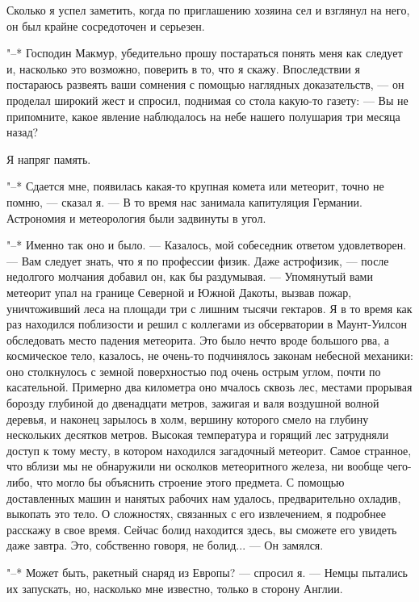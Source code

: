 Сколько я успел заметить, когда по приглашению хозяина сел  и  взглянул
на него, он был крайне сосредоточен и серьезен.

"--* Господин  Макмур,  убедительно  прошу  постараться  понять  меня  как
следует  и,  насколько  это  возможно,  поверить  в  то,  что   я   скажу.
Впоследствии я постараюсь  развеять  ваши  сомнения  с  помощью  наглядных
доказательств, --- он проделал широкий жест и  спросил,  поднимая  со  стола
какую-то газету: --- Вы не припомните, какое  явление  наблюдалось  на  небе
нашего полушария три месяца назад?

Я напряг память.

"--* Сдается мне, появилась какая-то крупная комета или метеорит, точно не
помню, --- сказал я.  ---  В  то  время  нас  занимала  капитуляция  Германии.
Астрономия и метеорология были задвинуты в угол.

"--*  Именно  так  оно  и  было.  ---  Казалось,  мой   собеседник   ответом
удовлетворен. ---  Вам  следует  знать,  что  я  по  профессии  физик.  Даже
астрофизик, --- после недолгого молчания добавил он, как  бы  раздумывая.  ---
Упомянутый вами метеорит упал на границе Северной и Южной  Дакоты,  вызвав
пожар, уничтоживший леса на площади три с лишним тысячи гектаров. Я  в  то
время как раз находился поблизости и решил с коллегами из  обсерватории  в
Маунт-Уилсон обследовать место падения метеорита.  Это  было  нечто  вроде
большого рва,  а  космическое  тело,  казалось,  не  очень-то  подчинялось
законам небесной механики: оно столкнулось с земной поверхностью под очень
острым углом, почти по касательной. Примерно  два  километра  оно  мчалось
сквозь лес,  местами  прорывая  борозду  глубиной  до  двенадцати  метров,
зажигая и валя воздушной  волной  деревья,  и  наконец  зарылось  в  холм,
вершину которого смело на  глубину  нескольких  десятков  метров.  Высокая
температура и горящий лес  затрудняли  доступ  к  тому  месту,  в  котором
находился загадочный метеорит. Самое странное, что вблизи мы не обнаружили
ни осколков  метеоритного  железа,  ни  вообще  чего-либо,  что  могло  бы
объяснить строение этого предмета. С помощью доставленных машин и  нанятых
рабочих  нам  удалось,  предварительно  охладив,  выкопать  это  тело.   О
сложностях, связанных с его  извлечением,  я  подробнее  расскажу  в  свое
время. Сейчас болид находится здесь, вы сможете его увидеть  даже  завтра.
Это, собственно говоря, не болид... --- Он замялся.

"--* Может быть, ракетный снаряд из Европы? --- спросил я. --- Немцы  пытались
их запускать, но, насколько мне известно, только в сторону Англии.

